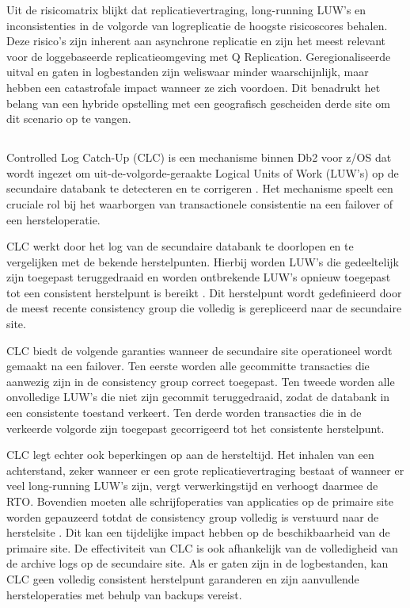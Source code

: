 \FloatBarrier

Uit de risicomatrix blijkt dat replicatievertraging, long-running LUW's en inconsistenties in de volgorde van logreplicatie de hoogste risicoscores behalen.
Deze risico's zijn inherent aan asynchrone replicatie en zijn het meest relevant voor de loggebaseerde replicatieomgeving met Q Replication.
Geregionaliseerde uitval en gaten in logbestanden zijn weliswaar minder waarschijnlijk, maar hebben een catastrofale impact wanneer ze zich voordoen.
Dit benadrukt het belang van een hybride opstelling met een geografisch gescheiden derde site om dit scenario op te vangen.

\subsection{}%
\label{sec:rol-clc}

Controlled Log Catch-Up (CLC) is een mechanisme binnen Db2 voor z/OS dat wordt ingezet om uit-de-volgorde-geraakte Logical Units of Work (LUW's) op de secundaire databank te detecteren en te corrigeren \autocite{ibm_2021_db2_clc}.
Het mechanisme speelt een cruciale rol bij het waarborgen van transactionele consistentie na een failover of een hersteloperatie.

CLC werkt door het log van de secundaire databank te doorlopen en te vergelijken met de bekende herstelpunten.
Hierbij worden LUW's die gedeeltelijk zijn toegepast teruggedraaid en worden ontbrekende LUW's opnieuw toegepast tot een consistent herstelpunt is bereikt \autocite{ibm_2026_db2}.
Dit herstelpunt wordt gedefinieerd door de meest recente consistency group die volledig is gerepliceerd naar de secundaire site.

CLC biedt de volgende garanties wanneer de secundaire site operationeel wordt gemaakt na een failover.
Ten eerste worden alle gecommitte transacties die aanwezig zijn in de consistency group correct toegepast.
Ten tweede worden alle onvolledige LUW's die niet zijn gecommit teruggedraaid, zodat de databank in een consistente toestand verkeert.
Ten derde worden transacties die in de verkeerde volgorde zijn toegepast gecorrigeerd tot het consistente herstelpunt.

CLC legt echter ook beperkingen op aan de hersteltijd.
Het inhalen van een achterstand, zeker wanneer er een grote replicatievertraging bestaat of wanneer er veel long-running LUW's zijn, vergt verwerkingstijd en verhoogt daarmee de RTO\@.
Bovendien moeten alle schrijfoperaties van applicaties op de primaire site worden gepauzeerd totdat de consistency group volledig is verstuurd naar de herstelsite \autocite{ibm_2021_ibm_copy_consistency_groups}.
Dit kan een tijdelijke impact hebben op de beschikbaarheid van de primaire site.
De effectiviteit van CLC is ook afhankelijk van de volledigheid van de archive logs op de secundaire site.
Als er gaten zijn in de logbestanden, kan CLC geen volledig consistent herstelpunt garanderen en zijn aanvullende hersteloperaties met behulp van backups vereist.

